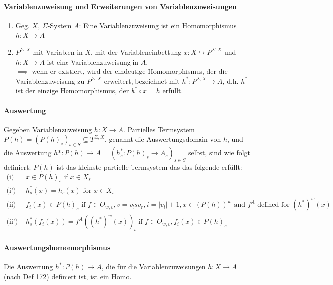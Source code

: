 \paragraph{ Variablenzuweisung und Erweiterungen von Variablenzuweisungen} 
\begin{enumerate}
\item Geg. $X$, $\Sigma$-System $A$: Eine Variablenzuweisung ist ein Homomorphismus $h: X \rightarrow A$
\item $P^{\Sigma,X}$ mit Variablen in $X$, mit der Variableneinbettung $x: X \hookrightarrow P^{\Sigma,X}$ und $h: X \rightarrow A$ ist eine Variablenzuweisung in $A$. \\
$\implies$ wenn er existiert, wird der eindeutige Homomorphismus, der die Variablenzuweisung zu $P^{\Sigma,X}$ erweitert,  bezeichnet mit $h^*: P^{\Sigma,X} \rightarrow A$, d.h. $h^*$ ist der einzige Homomorphismus, der $h^* \circ x = h $ erfüllt.
\end{enumerate}

\paragraph{ Auswertung} 
Gegeben Variablenzuweisung $h: X \rightarrow A$. Partielles Termsystem $P(h) = (P(h)_s)_{s \in S} \subseteq T^{\Sigma,X}$, genannt die Auswertungsdomain von $h$, und die Auswertung $h*: P(h) \rightarrow A = (h_s^*: P(h)_s \rightarrow A_s)_{s \in S}$ selbst, sind wie folgt definiert:
$P(h)$ ist das kleinste partielle Termsystem das das folgende erfüllt: 
\begin{align*}
\textrm{(i) } & x\in P(h)_{s}\textrm{ if }x\in X_{s}\\
\textrm{(i') } & h_{s}^{*}(x)=h_{s}(x)\textrm{ for }x\in X_{s}\\
\textrm{(ii) } & f_{i}(x)\in P(h)_{s}\textrm{ if }f\in O_{w,v},v=v_{l}sv_{r},i=|v_{l}|+1,x\in\left(P(h)\right)^{w}\textrm{ and }f^{A}\textrm{ defined }\textrm{for }\left(h^{*}\right)^{w}(x)\\
\textrm{(ii') } & h_{s}^{*}(f_{i}(x))=f^{A}\left(\left(h^{*}\right)^{w}(x)\right)_{i}\textrm{ if }f\in O_{w,v},f_{i}(x)\in P(h)_{s}
\end{align*}

\paragraph{ Auswertungshomomorphismus}
Die Auswertung $h^*: P(h) \rightarrow A$, die für die Variablenzuweisungen $h: X \rightarrow A$ (nach Def 172) definiert ist, ist ein Homo.
 
